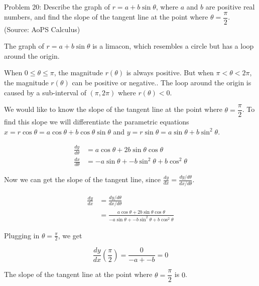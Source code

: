 Problem 20: Describe the graph of $r = a + b \sin \theta$, where $a$ and $b$ are positive real numbers, and find the slope of the tangent line at the point where $\theta = \dfrac{\pi}{2}$. (Source: AoPS Calculus)

The graph of $r = a + b \sin \theta$ is a limacon, which resembles a circle but has a loop around the origin.

When $0 \leq \theta \leq \pi$, the magnitude $r(\theta)$ is always positive. But when $\pi < \theta < 2\pi$, the magnitude $r(\theta)$ can be positive or negative.. The loop around the origin is caused by a sub-interval of $(\pi, 2\pi)$ where $r(\theta) < 0$.

We would like to know the slope of the tangent line at the point where $\theta = \dfrac{\pi}{2}$. To find this slope we will differentiate the parametric equations $x = r \cos \theta = a \cos \theta + b \cos \theta \sin \theta$ and $y = r \sin \theta = a \sin \theta + b \sin^2 \theta$.

\begin{align*}
\frac{dy}{d\theta} &= a \cos \theta + 2b \sin \theta \cos \theta \\
\frac{dx}{d\theta} &= -a \sin \theta + -b \sin^2 \theta + b \cos^2 \theta
\end{align*}

Now we can get the slope of the tangent line, since $\frac{dy}{dx} = \frac{dy/d\theta}{dx/d\theta}$.

\begin{align*}
\frac{dy}{dx} &= \frac{dy/d\theta}{dx/d\theta} \\
&= \frac{a \cos \theta + 2b \sin \theta \cos \theta}{-a \sin \theta + -b \sin^2 \theta + b \cos^2 \theta}
\end{align*}

Plugging in $\theta = \frac{\pi}{2}$, we get


$$ \frac{dy}{dx} \left( \frac{\pi}{2} \right) = \frac{0}{-a + -b} = \boxed{0} $$

The slope of the tangent line at the point where $\theta = \dfrac{\pi}{2}$ is $\boxed{0}$.
